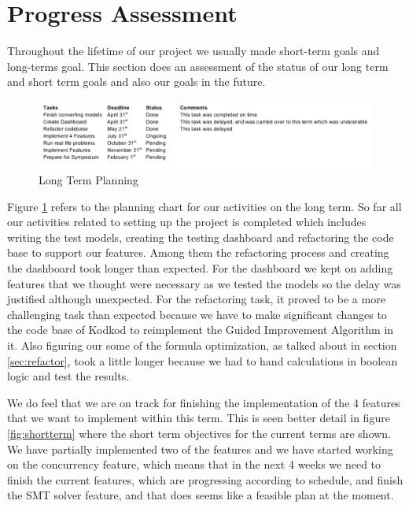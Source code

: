 \documentclass[11pt]{article}
\theoremstyle{definition}
\begin{document}
\section{Progress Assessment}\label{sec:progress}
Throughout the lifetime of our project we usually made short-term goals and long-terms goal. This section does an assessment of the status of our long term and short term goals and also our goals in the future.

\begin{figure}[H]
	\caption{Long Term Planning} \label{fig:longterm}
	\includegraphics[width=\textwidth]{planning/longterm}
\end{figure}

Figure \ref{fig:longterm} refers to the planning chart for our activities on the long term. So far all our activities related to setting up the project is completed which includes writing the test models, creating the testing dashboard and refactoring the code base to support our features. Among them the refactoring process and creating the dashboard took longer than expected. For the dashboard we kept on adding features that we thought were necessary as we tested the models so the delay was justified although unexpected. For the refactoring task, it proved to be a more challenging task than expected because we have to make significant changes to the code base of Kodkod to reimplement the Guided Improvement Algorithm in it. Also figuring our some of the formula optimization, as talked about in section \ref{sec:refactor}, took a little longer because we had to hand calculations in boolean logic and test the results.

We do feel that we are on track for finishing the implementation of the 4 features that we want to implement within this term. This is seen better detail in figure \ref{fig:shortterm} where the short term objectives for the current terms are shown. We have partially implemented two of the features and we have started working on the concurrency feature, which means that in the next 4 weeks we need to finish the current features, which are progressing according to schedule, and finish the SMT solver feature, and that does seems like a feasible plan at the moment. 
\end{document}
